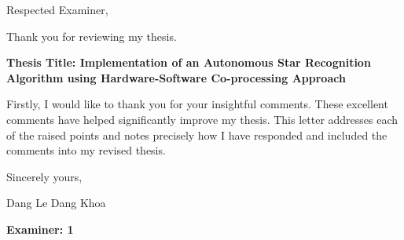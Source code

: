 \documentclass[dvips,a4paper,12pt]{report}
\begin{document}


\noindent Respected Examiner,

\noindent Thank you for reviewing my thesis.

\begin{center}
    \textbf{Thesis Title: Implementation of an Autonomous Star Recognition Algorithm using Hardware-Software Co-processing Approach} 
\end{center}

\noindent Firstly, I would like to thank you for your insightful comments. These excellent comments have helped significantly improve my thesis. This letter addresses each of the raised points and notes precisely how I have responded and included the comments into my revised thesis. \\

\vspace{0.5in}

\noindent Sincerely yours,

\noindent Dang Le Dang Khoa

\newpage

\color{blue}
\noindent \large{\textbf{Examiner: 1}}
\end{document}

